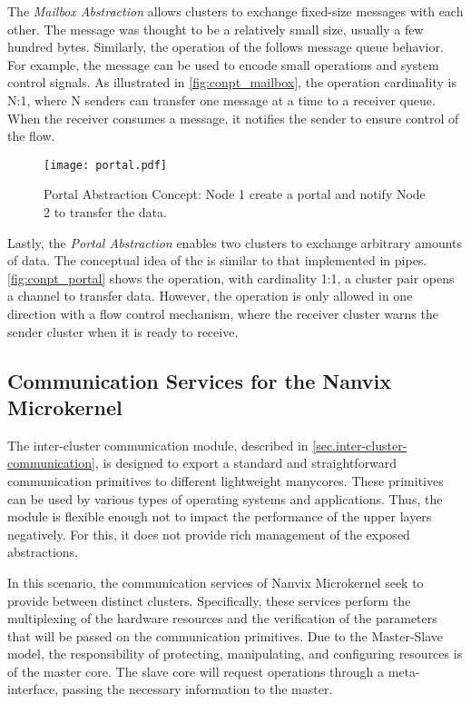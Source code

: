 				The \textit{Mailbox Abstraction} allows clusters to exchange fixed-size
				messages with each other.
				The message was thought to be a relatively small size, usually a few hundred bytes.
				Similarly, the operation of the \mailbox follows \posix message queue behavior.
				For example, the message can be used to encode small operations and system
				control signals.
				As illustrated in \autoref{fig:conpt_mailbox}, the operation cardinality is N:1,
				where N senders can transfer one message at a time to a receiver queue.
				When the receiver consumes a message, it notifies the sender to ensure
				control of the flow.

			\label{sec.portal-abs}

				\begin{figure}[t]
					\centering%
					\caption{Portal Abstraction Concept: Node 1 create a portal and notify Node 2 to transfer the data.}%
					\label{fig:conpt_portal}%
					\texttt{[image: portal.pdf]}%
				\end{figure}

				Lastly, the \textit{Portal Abstraction} enables two clusters to exchange arbitrary
				amounts of data.
				The conceptual idea of the \portal is similar to that implemented in \posix pipes.
				\autoref{fig:conpt_portal} shows the \portal operation, with cardinality
				1:1, a cluster pair opens a channel to transfer data.
				However, the operation is only allowed in one direction with a flow control mechanism,
				where the receiver cluster warns the sender cluster when it is ready to receive.
		
	\subsection{Communication Services for the Nanvix Microkernel}
	\label{sec.communication-services}
	
		The inter-cluster communication module, described in \autoref{sec.inter-cluster-communication},
		is designed to export a standard and straightforward communication
		primitives to different lightweight manycores.
		These primitives can be used by various types of operating systems
		and applications.
		Thus, the module is flexible enough not to impact the performance
		of the upper layers negatively.
		For this, it does not provide rich management of the exposed abstractions.

		In this scenario, the communication services of Nanvix Microkernel seek
		to provide \ipc between distinct clusters.
		Specifically, these services perform the multiplexing of the hardware
		resources and the verification of the parameters that will be passed
		on the communication primitives.
		Due to the Master-Slave model, the responsibility of protecting,
		manipulating, and configuring \hal resources is of the master core.
		The slave core will request operations through a meta-interface,
		passing the necessary information to the master.


